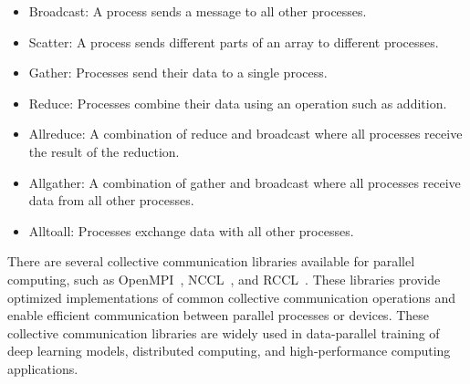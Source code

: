 \begin{itemize}
    \item Broadcast: A process sends a message to all other processes.
    \item Scatter: A process sends different parts of an array to
    different processes.
    \item Gather: Processes send their data to a single process.
    \item Reduce: Processes combine their data using an operation such as
    addition.
    \item Allreduce: A combination of reduce and broadcast where all
    processes receive the result of the reduction.
    \item Allgather: A combination of gather and broadcast where all
    processes receive data from all other processes.
    \item Alltoall: Processes exchange data with all other processes.
\end{itemize}


There are several collective communication libraries available for
parallel computing, such as OpenMPI~\cite{OpenMPI}, NCCL~\cite{nccl},
and RCCL~\cite{rccl}.
%
These libraries provide optimized implementations of common collective
communication operations and enable efficient communication between
parallel processes or devices.
%
These collective communication libraries are widely used in data-parallel
training of deep learning models, distributed computing, and
high-performance computing applications.